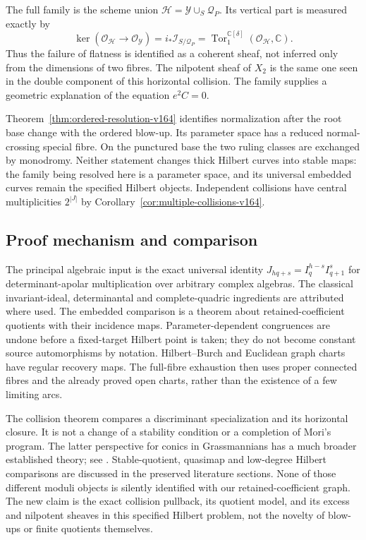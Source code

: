 \documentclass[11pt,reqno]{amsart}
\numberwithin{equation}{section}
\theoremstyle{definition}\newtheorem{definition}[theorem]{Definition}
\theoremstyle{remark}\newtheorem{remark}[theorem]{Remark}
\newcommand{\C}{\mathbb C}\newcommand{\Q}{\mathbb Q}
\newcommand{\OO}{\mathcal O}\newcommand{\II}{\mathcal I}
\begin{document}
The full family is the scheme union
$\mathcal H=\mathcal Y\cup_S\mathcal Q_P$. Its vertical part is
measured exactly by
\[
 \ker(\OO_{\mathcal H}\to\OO_{\mathcal Y})
      =i_*\mathcal I_{S/\mathcal Q_P}
      =\operatorname{Tor}^{\C[\delta]}_1(\OO_{\mathcal H},\C).
\]
Thus the failure of flatness is identified as a coherent sheaf,
not inferred only from the dimensions of two fibres. The nilpotent
sheaf of $X_2$ is the same one seen in the double component of this
horizontal collision. The family supplies a geometric explanation
of the equation $e^2C=0$.

Theorem~\ref{thm:ordered-resolution-v164} identifies normalization
after the root base change with the ordered blow-up. Its parameter
space has a reduced normal-crossing special fibre. On the punctured
base the two ruling classes are exchanged by monodromy. Neither
statement changes thick Hilbert curves into stable maps: the family
being resolved here is a parameter space, and its universal embedded
curves remain the specified Hilbert objects. Independent collisions
have central multiplicities $2^{|J|}$ by
Corollary~\ref{cor:multiple-collisions-v164}.

\subsection{Proof mechanism and comparison}
The principal algebraic input is the exact universal identity
$J_{hq+s}=I_q^{h-s}I_{q+1}^s$ for determinant-apolar multiplication
over arbitrary complex algebras. The classical invariant-ideal,
determinantal and complete-quadric ingredients are attributed where
used. The embedded comparison is a theorem about retained-coefficient
quotients with their incidence maps. Parameter-dependent congruences
are undone before a fixed-target Hilbert point is taken; they do not
become constant source automorphisms by notation. Hilbert--Burch and
Euclidean graph charts have regular recovery maps. The full-fibre
exhaustion then uses proper connected fibres and the already proved
open charts, rather than the existence of a few limiting arcs.

The collision theorem compares a discriminant specialization and its
horizontal closure. It is not a change of a stability condition or
a completion of Mori's program. The latter perspective for conics
in Grassmannians has a much broader established theory; see
\cite[Theorem~1.1 and Section~3.1]{ChungMoon164}. Stable-quotient,
quasimap and low-degree Hilbert comparisons are discussed in the
preserved literature sections. None of those different moduli
objects is silently identified with our retained-coefficient graph.
The new claim is the exact collision pullback, its quotient model,
and its excess and nilpotent sheaves in this specified Hilbert
problem, not the novelty of blow-ups or finite quotients themselves.
\end{document}
